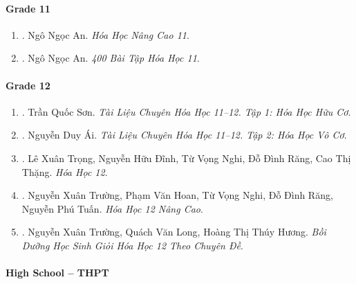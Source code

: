 \documentclass{article}
\begin{document}
\paragraph{Grade 11}

\begin{enumerate}
	\item \cite{An_Hoa_Hoc_nang_cao_11}. Ngô Ngọc An. {\it Hóa Học Nâng Cao 11}.\hfill{\sf[reading]}
	
	\item \cite{An_400_BT_Hoa_Hoc_11}. Ngô Ngọc An. {\it 400 Bài Tập Hóa Học 11}.\hfill{\sf[reading]}
\end{enumerate}

\paragraph{Grade 12}

\begin{enumerate}	
	\item \cite{Son2021}. Trần Quốc Sơn. {\it Tài Liệu Chuyên Hóa Học 11--12. Tập 1: Hóa Học Hữu Cơ}.\hfill{\sf[reading]}
	
	\item \cite{Ai2022}. Nguyễn Duy Ái. {\it Tài Liệu Chuyên Hóa Học 11--12. Tập 2: Hóa Học Vô Cơ}.\hfill{\sf[reading]}
	
	\item \cite{SGK_Hoa_Hoc_12_co_ban}. Lê Xuân Trọng, Nguyễn Hữu Đĩnh, Từ Vọng Nghi, Đỗ Đình Răng, Cao Thị Thặng. {\it Hóa Học 12}.\hfill{\sf[reading]}
	
	\item \cite{SGK_Hoa_Hoc_12_nang_cao}. Nguyễn Xuân Trường, Phạm Văn Hoan, Từ Vọng Nghi, Đỗ Đình Răng, Nguyễn Phú Tuấn. {\it Hóa Học 12 Nâng Cao}.
	
	\item \cite{Truong_Long_Huong_bdhsg_Hoa_Hoc_12}. Nguyễn Xuân Trường, Quách Văn Long, Hoàng Thị Thúy Hương. {\it Bồi Dưỡng Học Sinh Giỏi Hóa Học 12 Theo Chuyên Đề}.\hfill{\sf[reading]}
\end{enumerate}

\paragraph{High School -- THPT}
\end{document}

